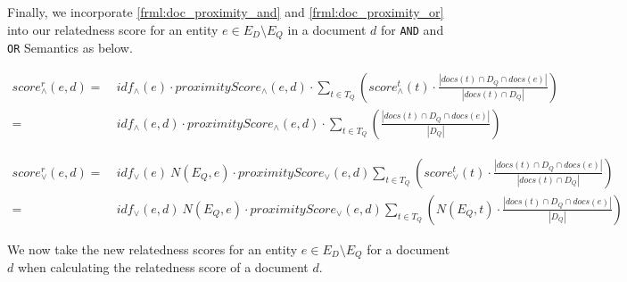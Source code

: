 \documentclass[10pt,a4paper]{article} %
\begin{document}
    \noindent Finally, we incorporate \ref{frml:doc_proximity_and} and \ref{frml:doc_proximity_or} into our relatedness score for an entity $e \in E_D \setminus E_Q$ in a document $d$ for {\tt AND} and {\tt OR} Semantics as below. 
    
    \begin{equation}
    \begin{split}
     score^{r}_\wedge(e,d) = & ~ idf_\wedge(e) \cdot  proximityScore_{\wedge}(e,d) \cdot \sum_{t \in T_Q}{(score^{t}_\wedge(t) \cdot \frac{|docs(t) \cap D_Q \cap docs(e)|}{|docs(t) \cap D_Q|})}\\
    = & ~ idf_\wedge(e,d) \cdot proximityScore_{\wedge}(e,d) \cdot \sum_{t \in T_Q}{(\frac{|docs(t) \cap D_Q \cap docs(e)|}{|D_Q|})}
    \end{split}
    \end{equation}

    \begin{equation}
    \begin{split}
     score^{r}_\vee(e,d) =  & ~ idf_\vee(e)~N(E_Q, e) \cdot proximityScore_{\vee}(e,d) \sum_{t \in T_Q}{(score^{t}_\vee(t) \cdot \frac{|docs(t) \cap D_Q \cap docs(e)|}{|docs(t) \cap D_Q|})} \\
    = & ~ idf_\vee(e,d)~N(E_Q, e) \cdot proximityScore_{\vee}(e,d) \sum_{t \in T_Q}{(N(E_Q, t) \cdot \frac{|docs(t) \cap D_Q \cap docs(e)|}{|D_Q|})}
    \end{split}
    \label{eq:relatednessScore}
    \end{equation}

    \noindent We now take the new relatedness scores for an entity $e \in E_D \setminus E_Q$ for a document $d$ when calculating the 
    relatedness score of a document $d$. 
    
\end{document}
